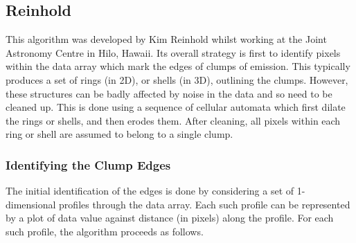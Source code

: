 \documentclass[twoside,11pt]{article}
\newcommand{\xlabel}[1]{}
\renewcommand{\_}{\texttt{\symbol{95}}}
\begin{document}
\subsection{\xlabel{reinhold}Reinhold}
This algorithm was developed by Kim Reinhold whilst working at the Joint
Astronomy Centre in Hilo, Hawaii. Its overall strategy is first to
identify pixels within the data array which mark the edges of clumps of
emission. This typically produces a set of rings (in 2D), or shells (in 3D),
outlining the clumps. However, these structures can be badly affected by
noise in the data and so need to be cleaned up. This is done using a
sequence of cellular automata which first dilate the rings or shells, and
then erodes them. After cleaning, all pixels within each ring or shell
are assumed to belong to a single clump.

\subsubsection{Identifying the Clump Edges}
The initial identification of the edges is done by considering a set of
1-dimensional profiles through the data array. Each such profile can be
represented by a plot of data value against distance (in pixels) along the
profile. For each such profile, the algorithm proceeds as follows.
\end{document}
